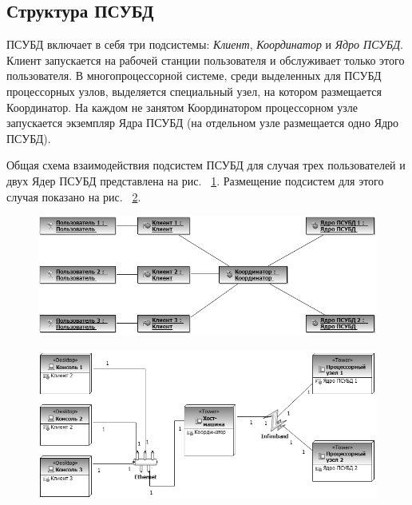 \documentclass[11pt,oneside]{article}
\begin{document}
	\subsection{Структура ПСУБД}\label{S_PDBMSStructure}
	ПСУБД включает в себя три подсистемы: \textit{Клиент}, \textit{Координатор} и \textit{Ядро ПСУБД}. Клиент запускается на рабочей станции пользователя и обслуживает только этого пользователя. В многопроцессорной системе, среди выделенных для ПСУБД процессорных узлов, выделяется специальный узел, на котором размещается Координатор. На каждом не занятом Координатором процессорном узле запускается экземпляр Ядра ПСУБД (на отдельном узле размещается одно Ядро ПСУБД).
	\par Общая схема взаимодействия подсистем ПСУБД для случая трех пользователей и двух Ядер ПСУБД представлена на рис. ~\ref{fig:sysobjectdiagram}. 
	Размещение подсистем для этого случая показано на рис. ~\ref{fig:sysdeploydiagram}.
	
	\begin{figure}[h]
		\centering
		\includegraphics[width=0.9\linewidth]{sysobjectdiagram}
		\caption{}
		\label{fig:sysobjectdiagram}
	\end{figure}
	
	\begin{figure}[h]
		\centering
		\includegraphics[width=0.9\linewidth]{sysdeploydiagram}
		\caption{}
		\label{fig:sysdeploydiagram}
	\end{figure}
	
\end{document}
